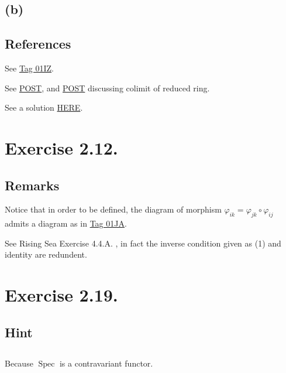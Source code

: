 \subsection{(b)}



\subsection{References}
See \href{https://stacks.math.columbia.edu/tag/01IZ}{Tag 01IZ}.

See \href{https://math.stackexchange.com/questions/437227/colimit-of-reduced-rings}{POST}, and \href{https://math.stackexchange.com/questions/2737301/reducedness-and-colimit}{POST} discussing colimit of reduced ring.

See a solution \href{https://www.math.ncku.edu.tw/~fjmliou/alg/reduced_scheme.pdf}{HERE}.


\section{Exercise 2.12.}

\subsection{Remarks}

Notice that in order to be defined, the diagram of morphism $\varphi_{ik}=\varphi_{jk}\circ\varphi_{ij}$ admits a diagram as in \href{https://stacks.math.columbia.edu/tag/01JA}{Tag 01JA}.

See Rising Sea Exercise 4.4.A. , in fact the inverse condition given as (1) and identity are redundent.

\section{Exercise 2.19.}

\subsection{Hint}



\subsection{}

Because $\operatorname{Spec}$ is a contravariant functor.